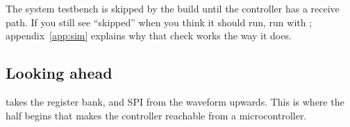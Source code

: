 The system testbench is skipped by the build until the controller has a receive path. If you still
see ``skipped'' when you think it should run, run with ;
appendix~\ref{app:sim} explains why that check works the way it does.

\subsection*{Looking ahead}
 takes the register bank, and SPI from the waveform upwards. This is where the half
begins that makes the controller reachable from a microcontroller.

